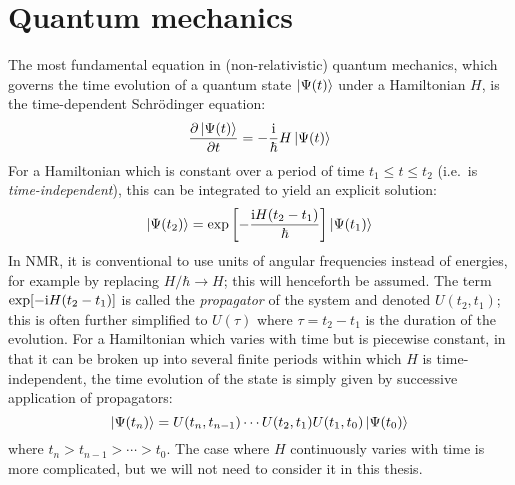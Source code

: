\section{Quantum mechanics}
\label{sec:theory__quantum_mechanics}

The most fundamental equation in (non-relativistic) quantum mechanics, which governs the time evolution of a quantum state $\ket{\Psi(t)}$ under a Hamiltonian $H$, is the time-dependent Schr\"{o}dinger equation:
\begin{equation}
    \label{eq:tdse}
    \frac{\partial\ket{\Psi(t)}}{\partial t} = -\frac{\mathrm{i}}{\hbar}H\ket{\Psi(t)} 
\end{equation}
For a Hamiltonian which is constant over a period of time $t_1 \leq t \leq t_2$ (i.e.\ is \textit{time-independent}), this can be integrated to yield an explicit solution:
\begin{equation}
    \label{eq:time_evolution}
    \ket{\Psi(t_2)} = \exp\left[-\frac{\mathrm{i} H (t_2 - t_1)}{\hbar}\right]\ket{\Psi(t_1)}
\end{equation}
In NMR, it is conventional to use units of angular frequencies instead of energies, for example by replacing $H/\hbar \to H$; this will henceforth be assumed.
The term $\exp[-\mathrm{i} H(t_2 - t_1)]$ is called the \textit{propagator} of the system and denoted $U(t_2, t_1)$; this is often further simplified to $U(\tau)$ where $\tau = t_2 - t_1$ is the duration of the evolution.
For a Hamiltonian which varies with time but is piecewise constant, in that it can be broken up into several finite periods within which $H$ is time-independent, the time evolution of the state is simply given by successive application of propagators:
\begin{equation}
    \label{eq:time_evolution_piecewise}
    \ket{\Psi(t_n)} = U(t_n,t_{n-1})\cdots U(t_2,t_1)U(t_1,t_0) \ket{\Psi(t_0)}
\end{equation}
where $t_n > t_{n-1} > \cdots > t_0$.
The case where $H$ continuously varies with time is more complicated, but we will not need to consider it in this thesis.

